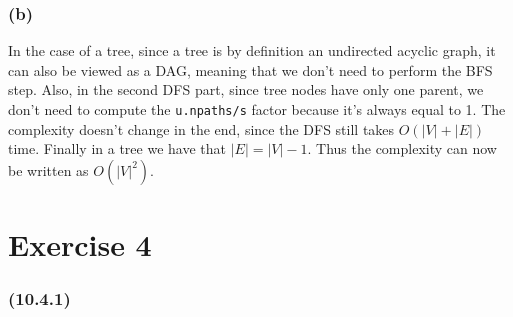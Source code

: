 \documentclass{article}
\begin{document}
\subsubsection*{(b)}
In the case of a tree,
since a tree is by definition an undirected acyclic graph,
it can also be viewed as a DAG,
meaning that we don't need to perform the BFS step.
Also, in the second DFS part, since tree nodes have only one parent,
we don't need to compute the \verb|u.npaths/s| factor
because it's always equal to 1.
The complexity doesn't change in the end,
since the DFS still takes \(O(|V| + |E|)\) time.
Finally in a tree we have that $|E| = |V| - 1$.
Thus the complexity can now be written as \(O(|V|^2)\).


\section*{Exercise 4}

\subsubsection*{(10.4.1)}





\end{document}
